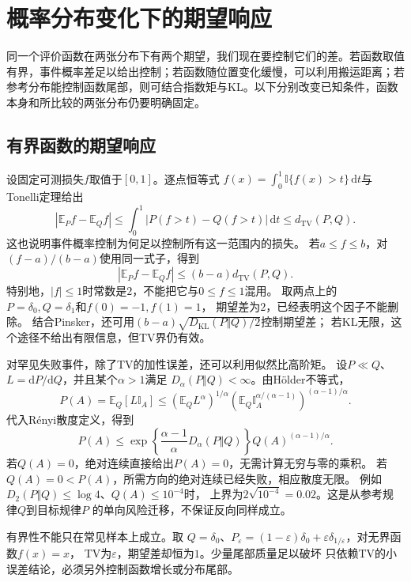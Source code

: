 \section{概率分布变化下的期望响应}
\label{sec:information-task-stability}
\label{sec:information-fixed-evaluation}

同一个评价函数在两张分布下有两个期望，我们现在要控制它们的差。若函数取值有界，事件概率差足以给出控制；若函数随位置变化缓慢，可以利用搬运距离；若参考分布能控制函数尾部，则可结合指数矩与KL。以下分别改变已知条件，函数本身和所比较的两张分布仍要明确固定。

\subsection{有界函数的期望响应}
\label{sec:information-bounded-evaluation}

设固定可测损失\(f\)取值于\([0,1]\)。逐点恒等式
\(f(x)=\int_0^1\mathbb I\{f(x)>t\}\,\mathrm dt\)与Tonelli定理给出
\[
  |\mathbb E_Pf-\mathbb E_Qf|
  \leq\int_0^1|P(f>t)-Q(f>t)|\,\mathrm dt
  \leq d_{\mathrm{TV}}(P,Q).
\]
这也说明事件概率控制为何足以控制所有这一范围内的损失。
若\(a\leq f\leq b\)，对\((f-a)/(b-a)\)使用同一式子，得到
\[
  |\mathbb E_Pf-\mathbb E_Qf|
  \leq(b-a)d_{\mathrm{TV}}(P,Q).
\]
特别地，\(|f|\leq1\)时常数是\(2\)，不能把它与\(0\leq f\leq1\)混用。
取两点上的\(P=\delta_0,Q=\delta_1\)和\(f(0)=-1,f(1)=1\)，
期望差为\(2\)，已经表明这个因子不能删除。
结合Pinsker，还可用\((b-a)\sqrt{D_{\mathrm{KL}}(P\Vert Q)/2}\)控制期望差；
若KL无限，这个途径不给出有限信息，但TV界仍有效。

对罕见失败事件，除了TV的加性误差，还可以利用似然比高阶矩。
设\(P\ll Q\)、\(L=\mathrm dP/\mathrm dQ\)，并且某个\(\alpha>1\)满足
\(D_\alpha(P\Vert Q)<\infty\)。由H\"older不等式，
\[
  P(A)=\mathbb E_Q[L\mathbb I_A]
  \leq(\mathbb E_QL^\alpha)^{1/\alpha}
       (\mathbb E_Q\mathbb I_A^{\alpha/(\alpha-1)})^{(\alpha-1)/\alpha}.
\]
代入R\'enyi散度定义，得到
\begin{equation}
  P(A)\leq
  \exp\!\left\{\frac{\alpha-1}{\alpha}D_\alpha(P\Vert Q)\right\}
  Q(A)^{(\alpha-1)/\alpha}.
  \label{eq:information-renyi-event-bound}
\end{equation}
若\(Q(A)=0\)，绝对连续直接给出\(P(A)=0\)，无需计算无穷与零的乘积。
若\(Q(A)=0<P(A)\)，所需方向的绝对连续已经失败，相应散度无限。
例如\(D_2(P\Vert Q)\leq\log4\)、\(Q(A)\leq10^{-4}\)时，
上界为\(2\sqrt{10^{-4}}=0.02\)。这是从参考规律\(Q\)到目标规律\(P\)
的单向风险迁移，不保证反向同样成立。

有界性不能只在常见样本上成立。取
\(Q=\delta_0\)、\(P_\varepsilon=(1-\varepsilon)\delta_0+
\varepsilon\delta_{1/\varepsilon}\)，对无界函数\(f(x)=x\)，
TV为\(\varepsilon\)，期望差却恒为\(1\)。少量尾部质量足以破坏
只依赖TV的小误差结论，必须另外控制函数增长或分布尾部。


